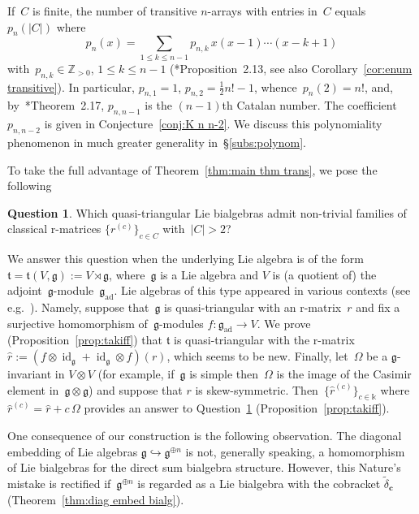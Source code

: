 \documentclass[12pt, reqno]{amsart}
\newcommand{\wh}[1]{\widehat{#1}}
\theoremstyle{definition}
\newtheorem{question}[theorem]{Question}
\numberwithin{equation}{section}
\newcommand{\tensor}{\otimes}
\newcommand{\kk}{\mathbb{k}}\newcommand{\lie}[1]{{\mathfrak{#1}}}
\newcommand{\ZZ}{{\mathbb Z}}
\DeclareMathOperator{\id}{id}
\DeclareMathOperator{\ad}{ad}
\begin{document}
If~$C$ is finite, the number of transitive $n$-arrays with entries in~$C$
equals~$p_n(|C|)$ where
\begin{equation}\label{eq:p_n pochhammer}
p_n(x)=\sum_{1\le k\le n-1} 
p_{n,k}\, x(x-1)\cdots (x-k+1)
\end{equation}
with~$p_{n,k}\in\ZZ_{>0}$, $1\le k\le n-1$ (\cite{ABGJepr}*{Proposition~2.13}, see also Corollary~\ref{cor:enum transitive}). In particular, 
$p_{n,1}=1$, $p_{n,2}=\frac12 n!-1$, whence~$p_n(2)=n!$, and, by~\cite{ABGJ}*{Theorem~2.17}, $p_{n,n-1}$ is the $(n-1)$th Catalan
number. The coefficient~$p_{n,n-2}$ is given in Conjecture~\ref{conj:K n n-2}. 
We discuss this polynomiality phenomenon in much greater generality in~\S\ref{subs:polynom}.

To take the full advantage of Theorem~\ref{thm:main thm trans}, we pose the following 
\begin{question}\label{prob:family}
Which quasi-triangular Lie bialgebras admit non-trivial families  of classical r-matrices $\{r^{(c)}\}_{c\in C}$ with~$|C|>2$?
\end{question}
We answer this question when the underlying Lie algebra is of the form~$\lie t=\lie t(V,\lie g):=V\rtimes \lie g$, where~$\lie g$ is a Lie algebra and $V$ is
(a quotient of) the adjoint~$\lie g$-module~$\lie g_{\ad}$. Lie algebras of this type appeared in various contexts (see e.g.~\cites{CG,AN,Chaf,ChKR,GM,Pan,Tak}). Namely, suppose that~$\lie g$ is quasi-triangular with an r-matrix~$r$ and fix a surjective homomorphism of~$\lie g$-modules $f:\lie g_{\ad}\to V$.
We prove (Proposition~\ref{prop:takiff}) that
$\lie t$ is quasi-triangular with the r-matrix
 $\wh r:=(f\tensor\id_{\lie g}+\id_{\lie g}\tensor f)(r)$, which seems to be new. Finally, let~$\Omega$ be a $\lie g$-invariant in $V\tensor V$ (for example, if~$\lie g$ is simple then~$\Omega$ is the image of the Casimir element in~$\lie g\tensor\lie g$) and
 suppose that $r$ is skew-symmetric. Then~$\{\wh r^{(c)}\}_{c\in \kk}$ where~$\wh r^{(c)}=\wh r+c\,\Omega$
 provides an answer to Question~\ref{prob:family}
(Proposition~\ref{prop:takiff}).

One consequence of our construction is the following observation. The diagonal embedding of Lie algebras $\lie g\hookrightarrow \lie g^{\oplus n}$ is not, generally speaking, a homomorphism of Lie bialgebras for the direct sum bialgebra structure. However, this Nature's mistake 
is rectified if~$\lie g^{\oplus n}$ is regarded as 
a Lie bialgebra with the cobracket $\tilde\delta_{\mathbf c}$ (Theorem~\ref{thm:diag embed bialg}).
\end{document}
